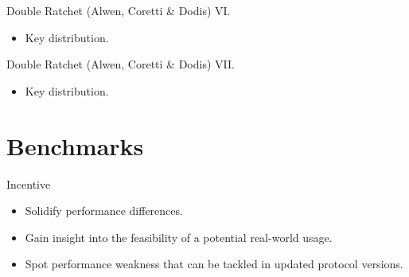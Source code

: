 \documentclass{beamer}
\begin{document}
\begin{frame}{Double Ratchet (Alwen, Coretti \& Dodis) VI.}
  \scriptsize
   \begin{minipage}[h]{0.49\textwidth}
      \begin{figure}[h]
        \centering
        \setlength{\fboxsep}{10pt}
        \scalebox{0.7}{%
        \fbox{%
          
        }
      }
    \end{figure}
    \end{minipage}
   \begin{minipage}[h]{0.49\textwidth}
      \begin{itemize}
      \item Key distribution.
      \end{itemize}
  \end{minipage}
\end{frame}

\begin{frame}{Double Ratchet (Alwen, Coretti \& Dodis) VII.}
  \scriptsize
   \begin{minipage}[h]{0.49\textwidth}
      \begin{figure}[h]
        \centering
        \setlength{\fboxsep}{10pt}
        \scalebox{0.7}{%
        \fbox{%
          
        }
      }
    \end{figure}
    \end{minipage}
   \begin{minipage}[h]{0.49\textwidth}
      \begin{itemize}
      \item Key distribution.
      \end{itemize}
  \end{minipage}
\end{frame}

\section{Benchmarks}
\label{sec:benchmarks}

\begin{frame}{Incentive}
  \begin{itemize}
  \item Solidify performance differences.
  \item Gain insight into the feasibility of a potential real-world usage.
  \item Spot performance weakness that can be tackled in updated protocol
    versions.
  \end{itemize}
\end{frame}
\end{document}
